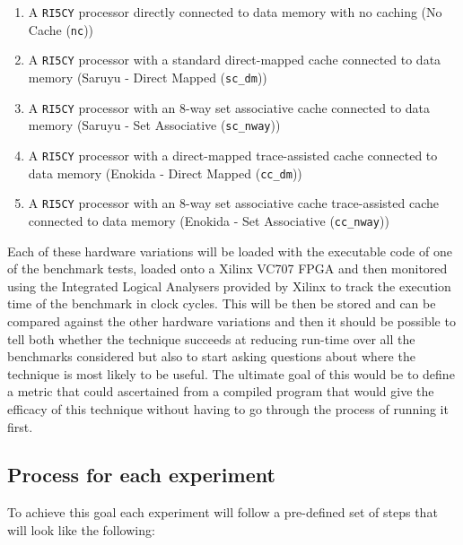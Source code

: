 \begin{enumerate}
	\item A \texttt{RI5CY} processor directly connected to data memory with no caching (No Cache (\texttt{nc}))
	\item A \texttt{RI5CY} processor with a standard direct-mapped cache connected to data memory (Saruyu - Direct Mapped (\texttt{sc\_dm}))
	\item A \texttt{RI5CY} processor with an 8-way set associative cache connected to data memory (Saruyu - Set Associative (\texttt{sc\_nway}))
	\item A \texttt{RI5CY} processor with a direct-mapped trace-assisted cache connected to data memory (Enokida - Direct Mapped (\texttt{cc\_dm}))
	\item A \texttt{RI5CY} processor with an 8-way set associative cache trace-assisted cache connected to data memory (Enokida - Set Associative (\texttt{cc\_nway}))
\end{enumerate}

Each of these hardware variations will be loaded with the executable code of one of the benchmark tests, loaded onto a Xilinx VC707 FPGA and then monitored using the Integrated Logical Analysers provided by Xilinx to track the execution time of the benchmark in clock cycles. This will be then be stored and can be compared against the other hardware variations and then it should be possible to tell both whether the technique succeeds at reducing run-time over all the benchmarks considered but also to start asking questions about where the technique is most likely to be useful. The ultimate goal of this would be to define a metric that could ascertained from a compiled program that would give the efficacy of this technique without having to go through the process of running it first.

\subsection{Process for each experiment}

To achieve this goal each experiment will follow a pre-defined set of steps that will look like the following:

